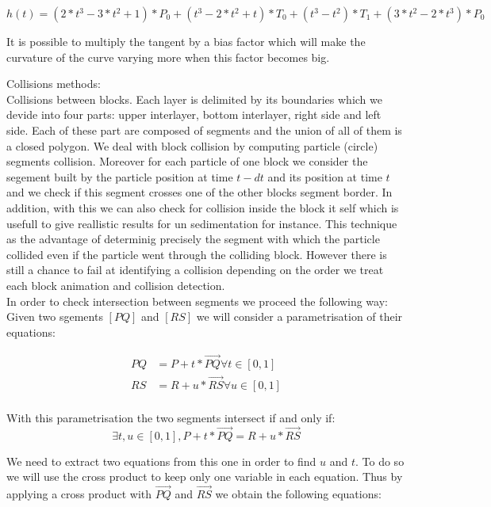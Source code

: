 \documentclass[12pt, a4paper]{memoir} %
\begin{document}
\begin{equation}
h(t) = (2*t^3 - 3*t^2 + 1)*P_0 + (t^3 - 2*t^2 + t)*T_0 + (t^3 -t^2)*T_1 +(3*t^2 - 2*t^3)*P_0
\end{equation}

It is possible to multiply the tangent by a bias factor which will make the curvature of the curve varying more when this factor becomes big.

Collisions methods: \\

Collisions between blocks. Each layer is delimited by its boundaries which we devide into four parts: upper interlayer, bottom interlayer, right side and left side. Each of these part are composed of segments and the union of all of them is a closed polygon. We deal with block collision by computing particle (circle) segments collision. Moreover for each particle of one block we consider the segement built by the particle position at time $t - dt$ and its position at time $t$ and we check if this segment crosses one of the other blocks segment border. In addition, with this we can also check for collision inside the block it self which is usefull to give reallistic results for un sedimentation for instance. This technique as the advantage of determinig precisely the segment with which the particle collided even if the particle went through the colliding block. However there is still a chance to fail at identifying a collision depending on the order we treat each block animation and collision detection.\\
In order to check intersection between segments we proceed the following way:\\
Given two sgements $[PQ]$ and $[RS]$ we will consider a parametrisation of their equations: 

\begin{align}
	PQ &= P + t*\overrightarrow{PQ} \forall t \in [0,1]\\
	RS &= R + u*\overrightarrow{RS} \forall u \in [0,1]\\
\end{align}

With this parametrisation the two segments intersect if and only if:\\
\begin{equation}
\exists t,u \in [0,1], P + t*\overrightarrow{PQ} = R + u*\overrightarrow{RS}
\end{equation}


We need to extract two equations from this one in order to find $u$ and $t$.
To do so we will use the cross product to keep only one variable in each equation. Thus by applying a cross product with $\overrightarrow{PQ}$ and $\overrightarrow{RS}$ we obtain the following equations:
\end{document}
